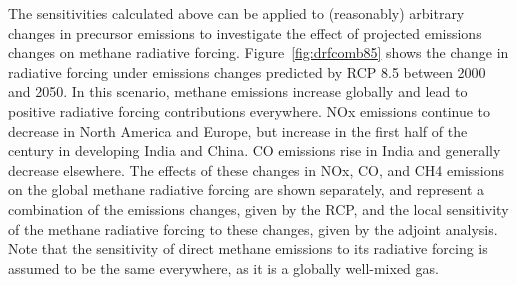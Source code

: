 The sensitivities calculated above can be applied to (reasonably) arbitrary changes in precursor emissions to investigate the effect of projected emissions changes on methane radiative forcing. Figure~\ref{fig:drfcomb85} shows the change in radiative forcing under emissions changes predicted by RCP 8.5 between 2000 and 2050. In this scenario, methane emissions increase globally and lead to positive radiative forcing contributions everywhere. NOx emissions continue to decrease in North America and Europe, but increase in the first half of the century in developing India and China. CO emissions rise in India and generally decrease elsewhere. The effects of these changes in NOx, CO, and CH4 emissions on the global methane radiative forcing are shown separately, and represent a combination of the emissions changes, given by the RCP, and the local sensitivity of the methane radiative forcing to these changes, given by the adjoint analysis. Note that the sensitivity of direct methane emissions to its radiative forcing is assumed to be the same everywhere, as it is a globally well-mixed gas.
